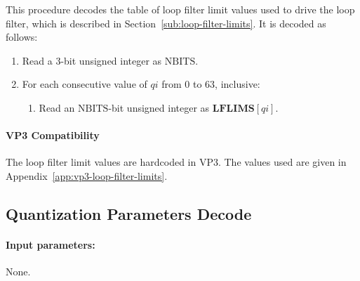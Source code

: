 \documentclass[9pt,letterpaper]{book}
\newcommand{\idx}[1]{{\ensuremath{\mathit{#1}}}}
\newcommand{\qi}{\idx{qi}}
\newcommand{\bitvar}[1]{\ensuremath{\mathbf{\bm{#1}}}}
\newcommand{\locvar}[1]{\ensuremath{\mathrm{#1}}}
\numberwithin{equation}{chapter}
\numberwithin{figure}{chapter}
\numberwithin{table}{chapter}
\begin{document}
This procedure decodes the table of loop filter limit values used to drive the
 loop filter, which is described in Section~\ref{sub:loop-filter-limits}.
It is decoded as follows:

\begin{enumerate}
\item
Read a 3-bit unsigned integer as \locvar{NBITS}.
\item
For each consecutive value of \locvar{\qi} from $0$ to $63$, inclusive:
\begin{enumerate}
\item
Read an \locvar{NBITS}-bit unsigned integer as $\bitvar{LFLIMS}[\locvar{\qi}]$.
\end{enumerate}
\end{enumerate}

\paragraph{VP3 Compatibility}

The loop filter limit values are hardcoded in VP3.
The values used are given in Appendix~\ref{app:vp3-loop-filter-limits}.

\subsection{Quantization Parameters Decode}
\label{sub:quant-params}

\paragraph{Input parameters:} None.
\end{document}
